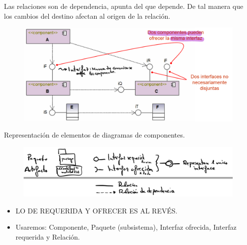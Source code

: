 \documentclass[12pt, twoside, openright]{report} %
\begin{document}
Las relaciones son de dependencia, apunta del que depende. De tal
manera que los cambios del destino afectan al origen de la relación.
\begin{figure}[H]
	{\includegraphics[scale=.3]{Untitled 33.png}}
\end{figure}
\pagebreak
Representación de elementos de diagramas de componentes.
\begin{figure}[H]
	{\includegraphics[scale=.3]{Untitled 34.png}}
\end{figure}
\begin{itemize}
	\item LO DE REQUERIDA Y OFRECER ES AL REVÉS.
	\item Usaremos: Componente, Paquete (subsistema), Interfaz ofrecida,
	Interfaz requerida y Relación.
\end{itemize}
\end{document}
